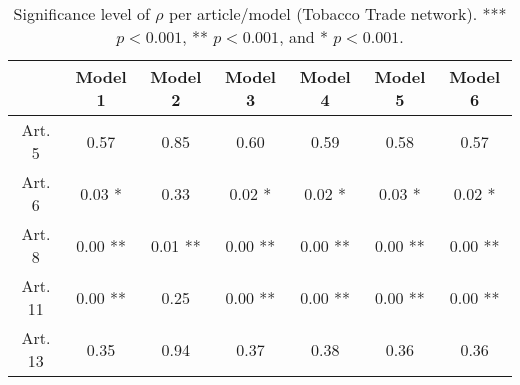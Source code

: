 \begin{table}[ht]
\centering
\begin{tabular}{ccccccc}
  \toprule
 & Model 1 & Model 2 & Model 3 & Model 4 & Model 5 & Model 6 \\ 
  \midrule
Art. 5 & 0.57   & 0.85   & 0.60   & 0.59   & 0.58   & 0.57   \\ 
   \midrule
Art. 6 & 0.03 * & 0.33   & 0.02 * & 0.02 * & 0.03 * & 0.02 * \\ 
   \midrule
Art. 8 & 0.00 ** & 0.01 ** & 0.00 ** & 0.00 ** & 0.00 ** & 0.00 ** \\ 
   \midrule
Art. 11 & 0.00 ** & 0.25   & 0.00 ** & 0.00 ** & 0.00 ** & 0.00 ** \\ 
   \midrule
Art. 13 & 0.35   & 0.94   & 0.37   & 0.38   & 0.36   & 0.36   \\ 
   \bottomrule
\end{tabular}
\caption{Significance level of $\rho$ per article/model (Tobacco Trade network). *** $p < 0.001$, ** $p < 0.001$, and * $p < 0.001$.} 
\end{table}
